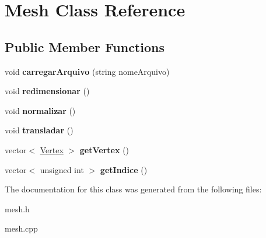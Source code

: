 \hypertarget{classMesh}{\section{Mesh Class Reference}
\label{classMesh}
}
\subsection*{Public Member Functions}
\begin{DoxyCompactItemize}
\item 
\hypertarget{classMesh_ae393146539bdb23d6614501c9618357a}{void {\bfseries carregar\-Arquivo} (string nome\-Arquivo)}\label{classMesh_ae393146539bdb23d6614501c9618357a}

\item 
\hypertarget{classMesh_a3a90a7b3e97fac3718fe815826232263}{void {\bfseries redimensionar} ()}\label{classMesh_a3a90a7b3e97fac3718fe815826232263}

\item 
\hypertarget{classMesh_a7bff6f85614fb7d4ef36d0524c07b281}{void {\bfseries normalizar} ()}\label{classMesh_a7bff6f85614fb7d4ef36d0524c07b281}

\item 
\hypertarget{classMesh_aba7fd1e9dddfc8ded653caebb8ac51c3}{void {\bfseries transladar} ()}\label{classMesh_aba7fd1e9dddfc8ded653caebb8ac51c3}

\item 
\hypertarget{classMesh_abdff0e07055abb34f148fbe3844a7dc6}{vector$<$ \hyperlink{structVertex}{Vertex} $>$ {\bfseries get\-Vertex} ()}\label{classMesh_abdff0e07055abb34f148fbe3844a7dc6}

\item 
\hypertarget{classMesh_a1c64e3b7149df6dbb7a260b02e1a6abe}{vector$<$ unsigned int $>$ {\bfseries get\-Indice} ()}\label{classMesh_a1c64e3b7149df6dbb7a260b02e1a6abe}

\end{DoxyCompactItemize}


The documentation for this class was generated from the following files\-:\begin{DoxyCompactItemize}
\item 
mesh.\-h\item 
mesh.\-cpp\end{DoxyCompactItemize}
